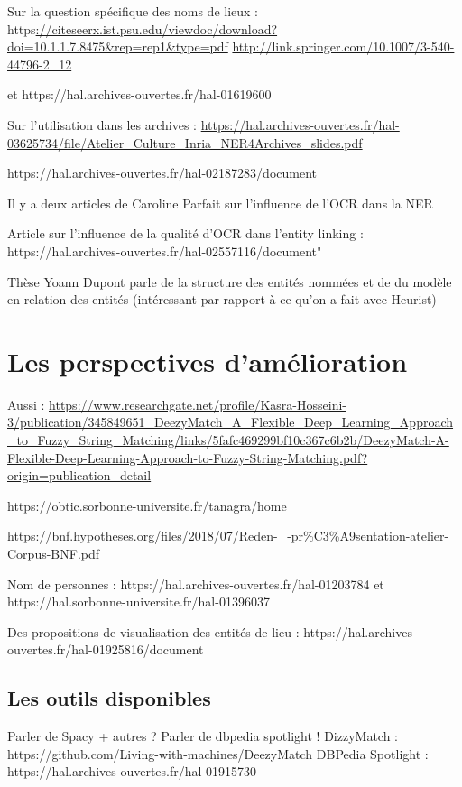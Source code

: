 \documentclass[a4paper,12pt,twoside]{book}
\begin{document}
	Sur la question spécifique des noms de lieux : https\url{://citeseerx.ist.psu.edu/viewdoc/download?doi=10.1.1.7.8475&rep=rep1&type=pdf}
	\url{http://link.springer.com/10.1007/3-540-44796-2_12}
	
	et https://hal.archives-ouvertes.fr/hal-01619600
	
	Sur l'utilisation dans les archives : \url{https://hal.archives-ouvertes.fr/hal-03625734/file/Atelier_Culture_Inria_NER4Archives_slides.pdf}
	
	https://hal.archives-ouvertes.fr/hal-02187283/document
	
	Il y a deux articles de Caroline Parfait sur l'influence de l'OCR dans la NER
	
	Article sur l'influence de la qualité d'OCR dans l'entity linking : 
	https://hal.archives-ouvertes.fr/hal-02557116/document"
	
	Thèse Yoann Dupont parle de la structure des entités nommées et de du modèle en relation des entités (intéressant par rapport à ce qu'on a fait avec Heurist)
	
	\section{Les perspectives d'amélioration}
	
	Aussi : \url{https://www.researchgate.net/profile/Kasra-Hosseini-3/publication/345849651_DeezyMatch_A_Flexible_Deep_Learning_Approach_to_Fuzzy_String_Matching/links/5fafc469299bf10c367c6b2b/DeezyMatch-A-Flexible-Deep-Learning-Approach-to-Fuzzy-String-Matching.pdf?origin=publication_detail}
	
	https://obtic.sorbonne-universite.fr/tanagra/home
	
	\url{https://bnf.hypotheses.org/files/2018/07/Reden-_-pr%C3%A9sentation-atelier-Corpus-BNF.pdf}
	
	Nom de personnes : https://hal.archives-ouvertes.fr/hal-01203784
	et https://hal.sorbonne-universite.fr/hal-01396037
	
	Des propositions de visualisation des entités de lieu : https://hal.archives-ouvertes.fr/hal-01925816/document
	
	\subsection{Les outils disponibles}
	
	Parler de Spacy + autres ?
	Parler de dbpedia spotlight !
	DizzyMatch : https://github.com/Living-with-machines/DeezyMatch
	DBPedia Spotlight : https://hal.archives-ouvertes.fr/hal-01915730
	
\end{document}
